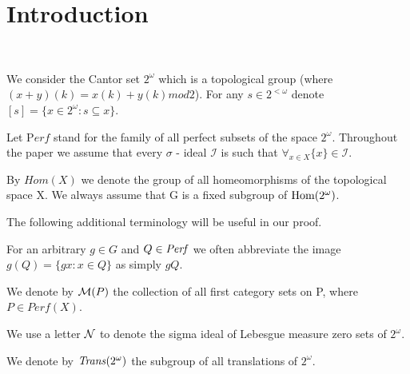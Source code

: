\documentclass[b5cutpaper, twoside, 11pt, leqno]{moravica}
\newcommand\trans{{\it Trans}(\ca)}
\newcommand{\seq}{\subseteq}
\newcommand{\ca}{2^{\omega}}
\newcommand{\mgr}{{\cal M}}
\newcommand{\neglig}{{\cal N}}
\newcommand{\oo}{\omega}
\newcommand{\real}{\bf R}
\newcommand{\perf}{{\it Perf}}
\newcommand{\cantor}{\ca}
\newcommand{\Perf}{{\mathrm Perf}}
\newcommand{\calI}{{\mathcal{I}}}
\newcommand\Hom{{\rm Hom(\ca)}}
\theoremstyle{definition}
\begin{document}
\section{Introduction}




\bigskip
{} \\
\bigskip

We consider the Cantor set $2^\omega$ 
which is a topological group (where 
$(x+y)(k) = x(k) + y(k) \mathit{mod} 2$).
For any $s\in 2^{<\omega}$ denote 
$[s] = \{x\in\cantor\colon s \subseteq x\}$.

Let $\Perf$ stand for the family of all perfect subsets of the space
$2^\omega$.
  Throughout the paper we assume that every $\sigma$ - ideal
$\calI$ is such that
  $\forall_{x\in X} \lbrace x \rbrace \in \calI$.


  By $Hom(X)$ we denote the group of all homeomorphisms of the
topological space X.
  We always assume that G is a fixed subgroup of $\Hom$.

The following additional terminology will be useful in our proof.

  For an arbitrary $g\in G$ and $Q \in \perf$
we often abbreviate the image $g(Q) = \lbrace gx: x\in Q \rbrace$
as simply $gQ$.

  We denote by $\mgr(P)$ the collection of all
first category sets on P, where $P \in Perf(X)$.

  We use a letter $\neglig$ to denote
the sigma ideal of Lebesgue measure zero sets of $2^\omega$.

  We denote by $\trans$ the subgroup of all
translations of $\cantor$. 
\end{document}
